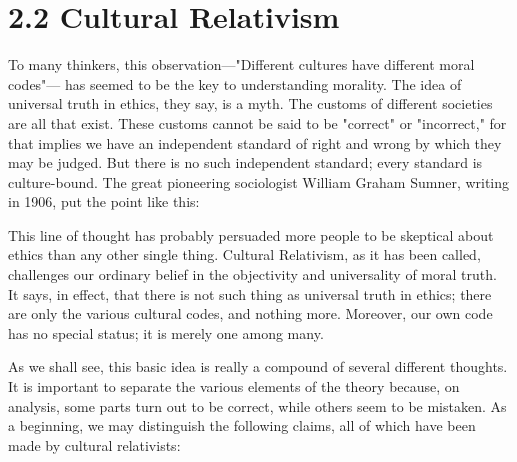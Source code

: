 \section{2.2 Cultural Relativism} 
To  many  thinkers,  this  observation—"Different  cultures  have  different 
moral  codes"— has  seemed  to  be  the  key  to  understanding  morality. 
The idea of universal truth in ethics, they say, is a myth. The customs of 
different societies are all that exist. These customs cannot be said to be 
"correct" or "incorrect," for that implies we have an independent standard 
of  right  and  wrong  by  which  they  may  be  judged.  But  there  is  no  such 
independent standard; every standard is culture-bound. The great 
pioneering  sociologist  William  Graham  Sumner, writing in  1906,  put  the 
point like this: 

This line of thought has probably persuaded more people to be skeptical 
about  ethics  than  any  other  single  thing.  Cultural  Relativism,  as  it  has 
been called, challenges our ordinary belief in the objectivity and 
universality  of  moral  truth.  It  says,  in  effect,  that  there  is  not  such  thing 
as universal truth in ethics; there are only the various cultural codes, and 
nothing more. Moreover, our own code has no special status; it is merely 
one among many. 

As we shall see, this basic idea is really a compound of several different 
thoughts.  It  is  important  to  separate  the  various  elements  of  the  theory 
because,  on  analysis,  some  parts  turn  out  to  be  correct,  while  others 
seem  to  be mistaken.  As  a  beginning,  we may  distinguish  the  following 
claims, all of which have been made by cultural relativists: 

